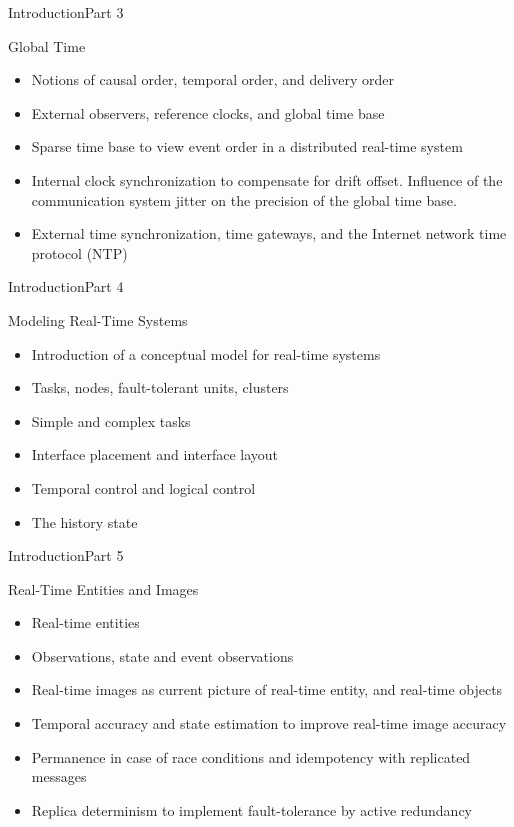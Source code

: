 \begin{frame}{Introduction}{Part 3}
    \begin{block}{Global Time}
\begin{itemize}
\item
  Notions of causal order, temporal order, and delivery order
\item
  External observers, reference clocks, and global time base
\item
  Sparse time base to view event order in a distributed real-time system
\item
  Internal clock synchronization to compensate for drift offset.
  Influence of the communication system jitter on the precision of the
  global time base.
\item
  External time synchronization, time gateways, and the Internet network
  time protocol (NTP)
\end{itemize}
\end{block}
\end{frame}


\begin{frame}{Introduction}{Part 4}
    \begin{block}{Modeling Real-Time Systems}
\begin{itemize}
\item
  Introduction of a conceptual model for real-time systems
\item
  Tasks, nodes, fault-tolerant units, clusters
\item
  Simple and complex tasks
\item
  Interface placement and interface layout
\item
  Temporal control and logical control
\item
  The history state
\end{itemize}
\end{block}
\end{frame}


\begin{frame}{Introduction}{Part 5}
    \begin{block}{Real-Time Entities and Images}
\begin{itemize}
\item
  Real-time entities
\item
  Observations, state and event observations
\item
  Real-time images as current picture of real-time entity, and real-time
  objects
\item
  Temporal accuracy and state estimation to improve real-time image
  accuracy
\item
  Permanence in case of race conditions and idempotency with replicated
  messages
\item
  Replica determinism to implement fault-tolerance by active redundancy
\end{itemize}
\end{block}
\end{frame}


